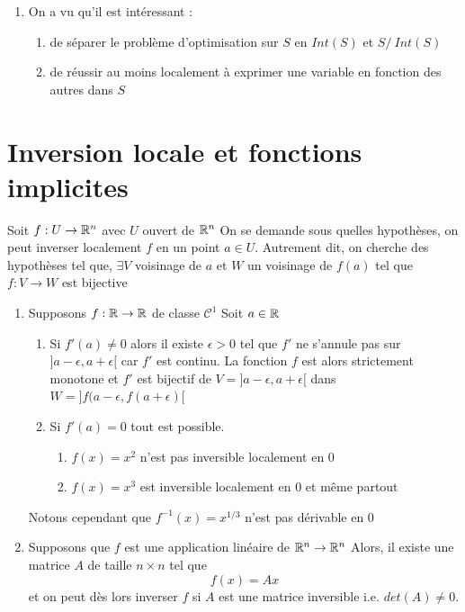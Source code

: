 \begin{remarque}
    \begin{enumerate}
        \item On a vu qu'il est intéressant :
        \begin{enumerate}
            \item de séparer le problème d'optimisation sur $S$ en $Int(S)$ et $S/ \ Int(S)$
            \item de réussir au moins localement à exprimer une variable en fonction des autres dans $S$
        \end{enumerate}
    \end{enumerate}
\end{remarque}

\section{Inversion locale et fonctions implicites}
Soit $f : U \to \mathbb{R}^n$ avec $U$ ouvert de $\mathbb{R}^n$
On se demande sous quelles hypothèses, on peut inverser localement $f$ en un point $a \in U$. 
Autrement dit, on cherche des hypothèses tel que, $\exists V$ voisinage de $a$ et $W$ un voisinage de $f(a)$ tel que $f:V \to W$ est bijective 
\begin{enumerate}
    \item Supposons $f : \mathbb{R} \to \mathbb{R}$ de classe $\mathcal C^1$
    Soit $a \in \mathbb{R}$
    \begin{enumerate}
        \item Si $f'(a) \ne 0$ alors il existe $\epsilon > 0$ tel que $f'$ ne s’annule pas sur $]a-\epsilon, a + \epsilon[$ car $f'$ est continu. La fonction $f$ est alors strictement monotone et $f'$ est bijectif
        de $V = ]a-\epsilon, a + \epsilon[$ dans $W = ]f(a-\epsilon,f(a+\epsilon)[$
        \item Si $f'(a) = 0$ tout est possible.
        \begin{exemple}
            \begin{enumerate}
                \item $f(x) = x^2$ n'est pas inversible localement en 0
                \item $f(x) = x^3$ est inversible localement en 0 et même partout 
            \end{enumerate}
        \end{exemple}
    \end{enumerate}
    Notons cependant que $f^{-1}(x) = x^{1/3}$ n'est pas dérivable en 0
    \item Supposons que $f$ est une application linéaire de $\mathbb{R}^n \to \mathbb{R}^n$
    Alors, il existe une matrice $A$ de taille $n\times n$ tel que 
    $$f(x) = Ax$$ et on peut dès lors inverser $f$ si $A$ est une matrice inversible i.e. $det(A) \ne 0$.
\end{enumerate}

